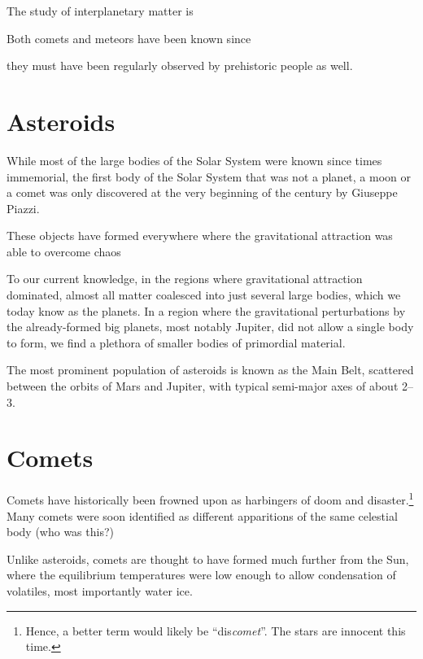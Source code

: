
The study of interplanetary matter is 

Both comets and meteors have been known since 

they must have been regularly observed by prehistoric people as well.



\section{Asteroids} \label{aa}
    While most of the large bodies of the Solar System were known since times immemorial,
    the first body of the Solar System that was not a planet, a moon or a comet was only discovered at
    the very beginning of the  century by Giuseppe Piazzi.

    These objects have formed everywhere where the gravitational attraction was able to overcome chaos \cite{...}

    To our current knowledge, in the regions where gravitational attraction dominated, almost all matter
    coalesced into just several large bodies, which we today know as the planets.
    In a region where the gravitational perturbations by the already-formed big planets, most notably Jupiter,
    did not allow a single body to form, we find a plethora of smaller bodies of primordial material.

    The most prominent population of asteroids is known as the Main Belt, scattered between the orbits
    of Mars and Jupiter, with typical semi-major axes of about \SIrange{2}{3}{\au}.

\section{Comets} \label{ac}
    Comets have historically been frowned upon as harbingers of doom and disaster.\footnote{Hence,
    a better term would likely be ``dis\textit{comet}''. The stars are innocent this time.}
    Many comets were soon identified as different apparitions of the same celestial body (who was this?)

    Unlike asteroids, comets are thought to have formed much further from the Sun, where the equilibrium
    temperatures were low enough to allow condensation of volatiles, most importantly water ice.

